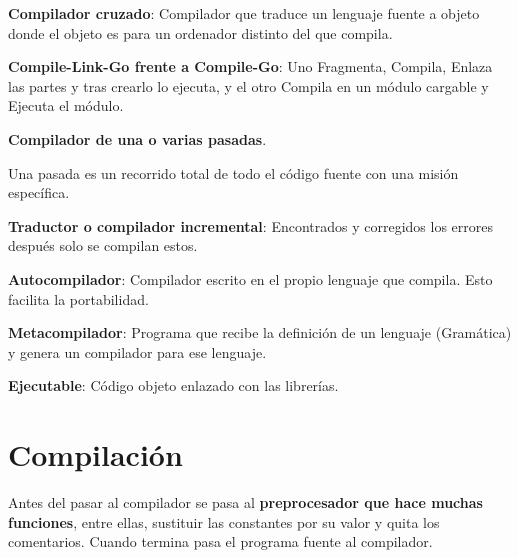 \documentclass[12pt, twoside, openright]{report} %
\begin{document}
\textbf{Compilador cruzado}: Compilador que traduce un lenguaje fuente a
objeto donde el objeto es para un ordenador distinto del que compila.

\textbf{Compile-Link-Go frente a Compile-Go}: Uno Fragmenta, Compila,
Enlaza las partes y tras crearlo lo ejecuta, y el otro Compila en un
módulo cargable y Ejecuta el módulo.

\textbf{Compilador de una o varias pasadas}.

Una pasada es un recorrido total de todo el código fuente con una misión
específica.

\textbf{Traductor o compilador incremental}: Encontrados y corregidos
los errores después solo se compilan estos.

\textbf{Autocompilador}: Compilador escrito en el propio lenguaje que
compila. Esto facilita la portabilidad.

\textbf{Metacompilador}: Programa que recibe la definición de un
lenguaje (Gramática) y genera un compilador para ese lenguaje.

\textbf{Ejecutable}: Código objeto enlazado con las librerías.


\section{Compilación}


\begin{figure}[H]
	{\def\svgwidth{.8\textwidth}
		}
\end{figure}

Antes del pasar al compilador se pasa al \textbf{preprocesador que hace muchas funciones}, entre ellas, sustituir las constantes por su valor y quita los comentarios. Cuando termina pasa el programa fuente al compilador.
\begin{figure}[H]
	{}
\end{figure}
\end{document}
